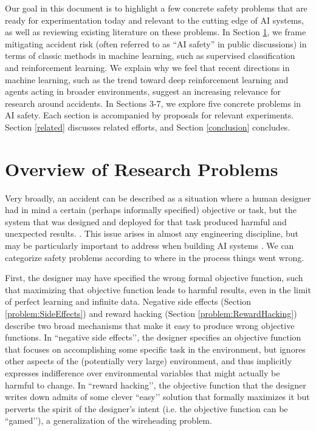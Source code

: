 \documentclass[a4paper,10pt]{article}
\begin{document}
Our goal in this document is to highlight a few concrete safety problems that are ready for experimentation today and relevant to the cutting edge of AI systems, as well as reviewing existing literature on these problems.  In Section \ref{overview}, we frame mitigating accident risk (often referred to as ``AI safety'' in public discussions) in terms of classic methods in machine learning, such as supervised classification and reinforcement learning. We explain why we feel that recent directions in machine learning, such as the trend toward deep reinforcement learning and agents acting in broader environments, suggest an increasing relevance for research around accidents. In Sections 3-7, we explore five concrete problems in AI safety.  Each section is accompanied by proposals for relevant experiments.  Section \ref{related} discusses related efforts, and Section \ref{conclusion} concludes.

\section{Overview of Research Problems} \label{overview}

Very broadly, an accident can be described as a situation where a human designer had in mind a certain (perhaps informally specified) objective or task, but the system that was designed and deployed for that task produced harmful and unexpected results. .  This issue arises in almost any engineering discipline, but may be particularly important to address when building AI systems \cite{steinhardt2015longterm}. We can categorize safety problems according to where in the process things went wrong. 

First, the designer may have specified the wrong formal objective function, such that maximizing that objective function leads to harmful results, even in the limit of perfect learning and infinite data.  Negative side effects (Section \ref{problem:SideEffects}) and reward hacking (Section \ref{problem:RewardHacking}) describe two broad mechanisms that make it easy to produce wrong objective functions.  In ``negative side effects’’, the designer specifies an objective function that focuses on accomplishing some specific task in the environment, but ignores other aspects of the (potentially very large) environment, and thus implicitly expresses indifference over environmental variables that might actually be harmful to change.  In ``reward hacking’’, the objective function that the designer writes down admits of some clever ``easy’’ solution that formally maximizes it but perverts the spirit of the designer's intent (i.e. the objective function can be ``gamed’’), a generalization of the wireheading problem.
\end{document}
